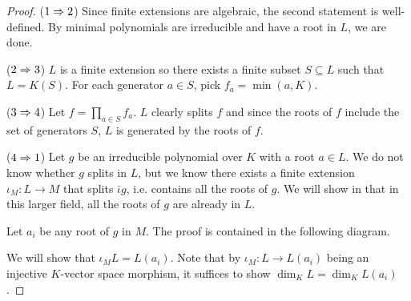 \documentclass[../book.tex]{subfiles}
\begin{document}
\begin{proof}
    ($1 \Rightarrow 2$) 
        Since finite extensions are algebraic, the second statement is well-defined.
        By minimal polynomials are irreducible and have a root in $L$, we are done. 
        
    ($2 \Rightarrow 3$)
        $L$ is a finite extension so 
        there exists a finite subset $S \subseteq L$ such that $L = K(S)$.
        For each generator $a \in S$, pick $f_a = \min(a,K)$. 
    
    ($3 \Rightarrow 4$)
        Let $f = \prod_{a \in S} f_a$. 
        $L$ clearly splits $f$ and 
        since the roots of $f$ include the set of generators $S$,
        $L$ is generated by the roots of $f$. 
        
    ($4 \Rightarrow 1$) 
        Let $g$ be an irreducible polynomial over $K$ with a root $a \in L$. 
        We do not know whether $g$ splits in $L$, 
        but we know there exists a finite extension $\iota_M : L \to M$
        that splits $\bar\iota g$, i.e. contains all the roots of $g$. 
        We will show in that in this larger field, 
        all the roots of $g$ are already in $L$. 
        
        Let $a_i$ be any root of $g$ in $M$.  
        The proof is contained in the following diagram. 
        \begin{figure} [H]
            \centering
        \end{figure}
        We will show that $\iota_M L = L(a_i)$.
        Note that by $\iota_M : L \to L(a_i)$ being 
        an injective $K$-vector space morphism, 
        it suffices to show $\dim_K L = \dim_K L(a_i)$.
        

\end{proof}
\end{document}
